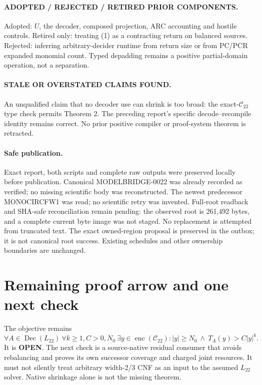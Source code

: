 \documentclass[11pt]{article}
\newcommand{\enc}{\operatorname{enc}}
\begin{document}
\paragraph{ADOPTED / REJECTED / RETIRED PRIOR COMPONENTS.}
Adopted: $U$, the decoder, composed projection, ARC accounting and hostile
controls. Retired only: treating (1) as a contracting return on balanced
sources. Rejected: inferring arbitrary-decider runtime from return size or
from PC/PCR expanded monomial count. Typed depadding remains a positive
partial-domain operation, not a separation.

\paragraph{STALE OR OVERSTATED CLAIMS FOUND.}
An unqualified claim that no decoder use can shrink is too broad: the
exact-$\mathcal C_{22}$ type check permits Theorem 2. The preceding report's
specific decode--recompile identity remains correct. No prior positive
compiler or proof-system theorem is retracted.

\paragraph{Safe publication.}
Exact report, both scripts and complete raw outputs were preserved locally
before publication. Canonical MODELBRIDGE-0022 was already recorded as
verified; no missing scientific body was reconstructed. The newest predecessor
MONOCIRCFW1 was read; no scientific retry was invented. Full-root readback
and SHA-safe reconciliation remain pending: the observed root is 261,492
bytes, and a complete current byte image was not staged. No replacement is
attempted from truncated text. The exact owned-region proposal is preserved
in the outbox; it is not canonical root success. Existing schedules and
other ownership boundaries are unchanged.

\section{Remaining proof arrow and one next check}
The objective remains
\[
 \forall A\in\operatorname{Dec}(L_{22})\ \forall k\ge1,C>0,N_0\ \exists y\in\enc(\mathcal C_{22}):
 |y|\ge N_0\ \land\ T_A(y)>C|y|^k.                       \tag{11}
\]
It is \textbf{OPEN}. The next check is a source-native residual consumer that
avoids rebalancing and proves its own successor coverage and charged joint
resources. It must not silently treat arbitrary width-2/3 CNF as an input to
the assumed $L_{22}$ solver. Native shrinkage alone is not the missing theorem.
\end{document}
